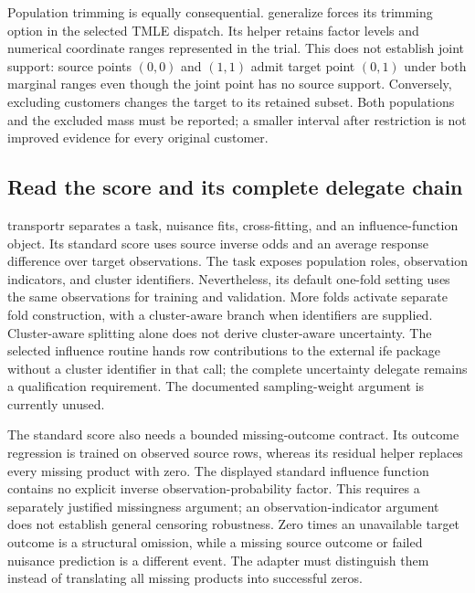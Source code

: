 Population trimming is equally consequential. generalize forces its trimming option in the selected TMLE dispatch. Its helper retains factor levels and numerical coordinate ranges represented in the trial. This does not establish joint support: source points $(0,0)$ and $(1,1)$ admit target point $(0,1)$ under both marginal ranges even though the joint point has no source support. Conversely, excluding customers changes the target to its retained subset. Both populations and the excluded mass must be reported; a smaller interval after restriction is not improved evidence for every original customer.~\citep{exec25_rtm_generalize,exec25_rtm_choice}

\subsection{Read the score and its complete delegate chain}

transportr separates a task, nuisance fits, cross-fitting, and an influence-function object. Its standard score uses source inverse odds and an average response difference over target observations. The task exposes population roles, observation indicators, and cluster identifiers. Nevertheless, its default one-fold setting uses the same observations for training and validation. More folds activate separate fold construction, with a cluster-aware branch when identifiers are supplied. Cluster-aware splitting alone does not derive cluster-aware uncertainty. The selected influence routine hands row contributions to the external ife package without a cluster identifier in that call; the complete uncertainty delegate remains a qualification requirement. The documented sampling-weight argument is currently unused.~\citep{exec25_rtm_transportr}

The standard score also needs a bounded missing-outcome contract. Its outcome regression is trained on observed source rows, whereas its residual helper replaces every missing product with zero. The displayed standard influence function contains no explicit inverse observation-probability factor. This requires a separately justified missingness argument; an observation-indicator argument does not establish general censoring robustness. Zero times an unavailable target outcome is a structural omission, while a missing source outcome or failed nuisance prediction is a different event. The adapter must distinguish them instead of translating all missing products into successful zeros.~\citep{exec25_rtm_transportr}

